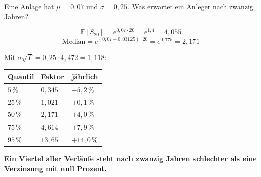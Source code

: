 \begin{aufgabe}
Eine Anlage hat $\mu = 0{,}07$ und $\sigma = 0{,}25$. Was erwartet ein Anleger nach zwanzig Jahren?

\loesung
{}
\[ \mathbb{E}[S_{20}] = e^{0{,}07\cdot20} = e^{1{,}4} = 4{,}055 \]
\[ \text{Median} = e^{(0{,}07-0{,}03125)\cdot20} = e^{0{,}775} = 2{,}171 \]

Mit $\sigma\sqrt{T} = 0{,}25\cdot4{,}472 = 1{,}118$:
\begin{center}
{\small
\renewcommand{\arraystretch}{1.48}
\begin{tabular}{@{}P{2.4cm}P{2.2cm}P{2.6cm}@{}}
\toprule
\textbf{Quantil} & \textbf{Faktor} & \textbf{jährlich}\\
\midrule
$5\,\%$ & $0{,}345$ & $-5{,}2\,\%$\\
$25\,\%$ & $1{,}021$ & $+0{,}1\,\%$\\
$50\,\%$ & $2{,}171$ & $+4{,}0\,\%$\\
$75\,\%$ & $4{,}614$ & $+7{,}9\,\%$\\
$95\,\%$ & $13{,}65$ & $+14{,}0\,\%$\\
\bottomrule
\end{tabular}}
\end{center}

\begin{center}
\begin{minipage}{0.9\textwidth}
\textbf{Ein Viertel aller Verläufe steht nach zwanzig Jahren schlechter als eine Verzinsung mit null Prozent.}
\end{minipage}
\end{center}

\begin{center}
\begin{minipage}{0.88\textwidth}
\end{minipage}
\end{center}
\end{aufgabe}

